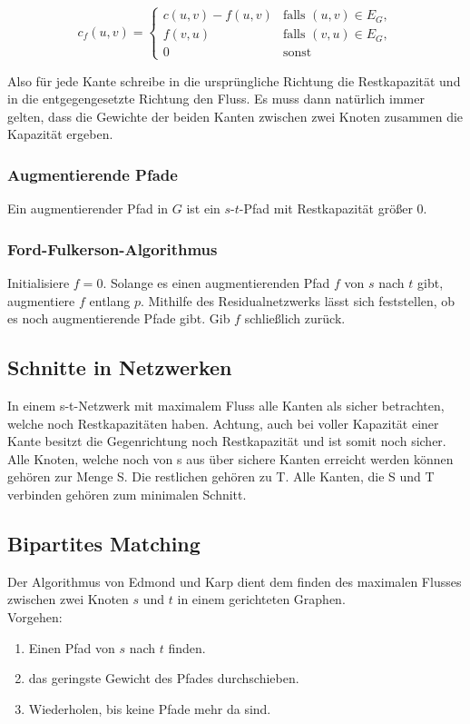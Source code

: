 \documentclass[11pt]{scrartcl}
\begin{document}
$$c_f(u,v) = \begin{cases}
	c(u,v) - f(u,v) & \text{falls } (u,v) \in E_G, \\
    f(v,u) & \text{falls } (v,u) \in E_G, \\
    0 & \text{sonst}
\end{cases}$$

Also für jede Kante schreibe in die ursprüngliche Richtung die Restkapazität und in die entgegengesetzte Richtung den Fluss. Es muss dann natürlich immer gelten, dass die Gewichte der beiden Kanten zwischen zwei Knoten zusammen die Kapazität ergeben.

\subsubsection{Augmentierende Pfade}
Ein augmentierender Pfad in $G$ ist ein $s$-$t$-Pfad mit Restkapazität größer 0.

\subsubsection{Ford-Fulkerson-Algorithmus}
Initialisiere $f=0$. Solange es einen augmentierenden Pfad $f$ von $s$ nach $t$ gibt, augmentiere $f$ entlang $p$. Mithilfe des Residualnetzwerks lässt sich feststellen, ob es noch augmentierende Pfade gibt. Gib $f$ schließlich zurück.

\subsection{Schnitte in Netzwerken}

In einem s-t-Netzwerk mit maximalem Fluss alle Kanten als sicher betrachten, welche noch Restkapazitäten haben. Achtung, auch bei voller Kapazität einer Kante besitzt die Gegenrichtung noch Restkapazität und ist somit noch sicher. Alle Knoten, welche noch von s aus über sichere Kanten erreicht werden können gehören zur Menge S. Die restlichen gehören zu T. Alle Kanten, die S und T verbinden gehören zum minimalen Schnitt.

\subsection{Bipartites Matching}
Der Algorithmus von Edmond und Karp dient dem finden des maximalen Flusses zwischen zwei Knoten $s$ und $t$ in einem gerichteten Graphen. \\
Vorgehen:
\begin{enumerate}
\item Einen Pfad von $s$ nach $t$ finden.
\item das geringste Gewicht des Pfades durchschieben.
\item Wiederholen, bis keine Pfade mehr da sind.
\end{enumerate}
\end{document}
